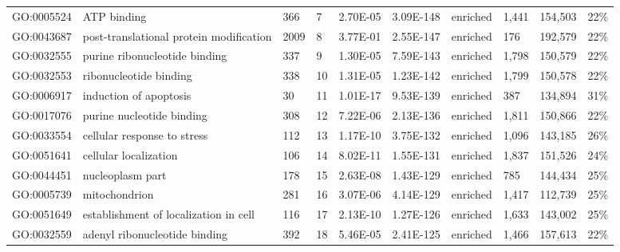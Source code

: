 \begin{sidewaystable}[!ht]
\begin{tabular}{lp{2cm}p{1cm}p{1cm}p{1.25cm}p{1.25cm}p{1cm}p{1.25cm}p{1.25cm}p{1.25cm}}
GO:0005524 & ATP binding                             & 366               & 7          & 2.70E-05             & 3.09E-148     & enriched & 1,441       & 154,503       & 22\%                 \\
GO:0043687 & post-translational protein modification & 2009              & 8          & 3.77E-01             & 2.55E-147     & enriched & 176         & 192,579       & 22\%                 \\
GO:0032555 & purine ribonucleotide binding           & 337               & 9          & 1.30E-05             & 7.59E-143     & enriched & 1,798       & 150,579       & 22\%                 \\
GO:0032553 & ribonucleotide binding                  & 338               & 10         & 1.31E-05             & 1.23E-142     & enriched & 1,799       & 150,578       & 22\%                 \\
GO:0006917 & induction of apoptosis                  & 30                & 11         & 1.01E-17             & 9.53E-139     & enriched & 387         & 134,894       & 31\%                 \\
GO:0017076 & purine nucleotide binding               & 308               & 12         & 7.22E-06             & 2.13E-136     & enriched & 1,811       & 150,866       & 22\%                 \\
GO:0033554 & cellular response to stress             & 112               & 13         & 1.17E-10             & 3.75E-132     & enriched & 1,096       & 143,185       & 26\%                 \\
GO:0051641 & cellular localization                   & 106               & 14         & 8.02E-11             & 1.55E-131     & enriched & 1,837       & 151,526       & 24\%                 \\
GO:0044451 & nucleoplasm part                        & 178               & 15         & 2.63E-08             & 1.43E-129     & enriched & 785         & 144,434       & 25\%                 \\
GO:0005739 & mitochondrion                           & 281               & 16         & 3.07E-06             & 4.14E-129     & enriched & 1,417       & 112,739       & 25\%                 \\
GO:0051649 & establishment of localization in cell   & 116               & 17         & 2.13E-10             & 1.27E-126     & enriched & 1,633       & 143,002       & 25\%                 \\
GO:0032559 & adenyl ribonucleotide binding           & 392               & 18         & 5.46E-05             & 2.41E-125     & enriched & 1,466       & 157,613       & 22\%                 \\

\end{tabular}
\end{sidewaystable}

